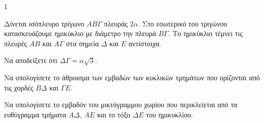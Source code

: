 \begin{ylh}{1}
    \item [Γεωμετρία, Εμβαδά]
\end{ylh}
\begin{figure}
    \centering
\end{figure}
Δίνεται ισόπλευρο τρίγωνο $ΑΒΓ$ πλευράς $2α$. Στο εσωτερικό του τριγώνου κατασκευάζουμε ημικύκλιο με διάμετρο την πλευρά $ΒΓ$. Το ημικύκλιο τέμνει τις πλευρές $ΑΒ$ και $ΑΓ$ στα σημεία $Δ$ και $Ε$ αντίστοιχα.

\begin{alist}
    \item Να αποδείξετε ότι $ΔΓ = α\sqrt{3}$. 
    \item Να υπολογίσετε το άθροισμα των εμβαδών των κυκλικών τμημάτων που ορίζονται από τις χορδές $ΒΔ$ και $ΓΕ$. 
    \item Να υπολογίσετε το εμβαδόν του μικτόγραμμου χωρίου που περικλείεται από τα ευθύγραμμα τμήματα $ΑΔ$, $ΑΕ$ και το τόξο $ΔΕ$ του ημικυκλίου. 
\end{alist}